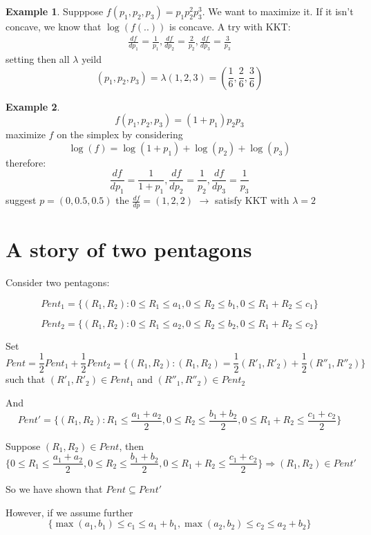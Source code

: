 \documentclass[twoside]{article}
\theoremstyle{definition} %
\newtheorem{example}{Example}
\begin{document}
\begin{appendices}
\begin{example}
  Supppose $f(p_1, p_2, p_3) = p_1 p_2^2 p_3^3$.
  We want to maximize it. If it isn't concave, we know that $\log(f(..))$ is concave. A try with KKT:
  \begin{align*}
    \frac{df}{dp_1} = \frac{1}{p_1}, \frac{df}{dp_2} = \frac{2}{p_2}, \frac{df}{dp_3} = \frac{3}{p_3}
  \end{align*}
  setting then all $\lambda$ yeild
  \[ (p_1, p_2, p_3) = \lambda (1, 2, 3) = ( \frac{1}{6}, \frac{2}{6}, \frac{3}{6}) \]
\end{example}

\begin{example}
  \[f(p_1, p_2, p_3) = (1 + p_1) p_2 p_3 \]
  maximize $f$ on the simplex by considering
  \[ \log(f) = \log(1 + p_1) + \log(p_2) + \log(p_3) \]
  therefore:
  \[
    \frac{df}{dp_1} = \frac{1}{1 + p_1}, \frac{df}{dp_2} = \frac{1}{p_2}, \frac{df}{dp_3} = \frac{1}{p_3}
  \]
  suggest $p = (0, 0.5, 0.5)$ the $\frac{df}{dp} = (1, 2, 2)$
  $\rightarrow$ satisfy KKT with $\lambda = 2$
\end{example}


\section{A story of two pentagons}
Consider two pentagons:

\[
  Pent_1 = \{(R_1, R_2): 0 \leq R_1 \leq a_1, 0 \leq R_2 \leq b_1, 0 \leq R_1 + R_2 \leq c_1  \}
\]

\[
  Pent_2 = \{(R_1, R_2): 0 \leq R_1 \leq a_2, 0 \leq R_2 \leq b_2, 0 \leq R_1 + R_2 \leq c_2  \}
\]

Set
\[
  Pent = \frac{1}{2} Pent_1 + \frac{1}{2} Pent_2 = \{(R_1, R_2): (R_1, R_2) =  \frac{1}{2} (R'_1, R'_2) + \frac{1}{2} (R''_1, R''_2)  \}
\]
such that $ (R'_1, R'_2) \in Pent_1 $ and $ (R''_1, R''_2) \in Pent_2 $

And
\[
  Pent' = \{(R_1, R_2): R_1 \leq \frac{a_1 + a_2}{2}, 0 \leq R_2 \leq \frac{b_1 + b_2}{2}, 0 \leq R_1 + R_2 \leq \frac{c_1 + c_2}{2} \}
\]

Suppose $(R_1, R_2) \in Pent$, then
\[
  \{ 0 \leq R_1 \leq \frac{a_1 + a_2}{2}, 0 \leq R_2 \leq \frac{b_1 + b_2}{2}, 0 \leq R_1 + R_2 \leq \frac{c_1 + c_2}{2} \} \Rightarrow (R_1, R_2) \in Pent'
\]

So we have shown that $Pent \subseteq Pent'$

However, if we assume further
\[
  \{ \max(a_1, b_1) \leq c_1 \leq a_1 + b_1, \max(a_2, b_2) \leq c_2 \leq a_2 + b_2\}
\]


\end{appendices}
\end{document}
